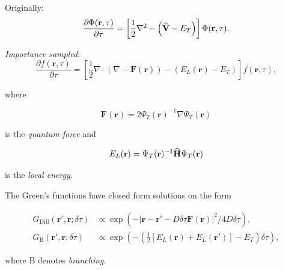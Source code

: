  \begin{frame}
   Originally:
 \begin{equation*}
  \frac{\partial \Phi(\mathbf{r}, \tau)}{\partial\tau} = \left[\frac{1}{2}\nabla^2 - \left({\bf\widehat{V}} - E_T\right)\right]\Phi(\mathbf{r}, \tau).
 \end{equation*}
 
 \pause
 
 \textit{Importance sampled}:
  \begin{equation}
  \frac{\partial f(\mathbf{r}, \tau)}{\partial\tau} = \left[\frac{1}{2}\nabla\cdot\left(\nabla - \mathbf{F}(\mathbf{r})\right) - (E_L(\mathbf{r}) - E_T)\right]f(\mathbf{r}, \tau),
 \end{equation}
 
 where
 
\begin{equation}
  \mathbf{F}(\mathbf{r}) =  2\Psi_T(\mathbf{r})^{-1}\nabla \Psi_T(\mathbf{r})
\end{equation}

is the \textit{quantum force} and 

\begin{equation} 
E_L(\mathbf{r}) = \Psi_T(\mathbf{r})^{-1}{\bf\widehat{H}}\Psi_T(\mathbf{r})
\end{equation}

is the \textit{local energy}. 

\end{frame}

\begin{frame}
 The Green's functions have closed form solutions on the form
 
 \begin{align*}
  G_{\mathrm{Diff}}(\mathbf{r}', \mathbf{r}; \delta\tau) &\propto \exp\left(-\left|\mathbf{r}-\mathbf{r}' - D\delta\tau \mathbf{F}(\mathbf{r})\right|^2/4D\delta\tau\right), \\
  G_{\mathrm{B}}(\mathbf{r}', \mathbf{r}; \delta\tau) &\propto \exp\left(-\left(\frac{1}{2}\left[E_L(\mathbf{r}) + E_L(\mathbf{r}')\right] - E_T\right)\delta\tau\right),
 \end{align*}

 where $\mathrm{B}$ denotes \textit{branching}.
 
\end{frame}

